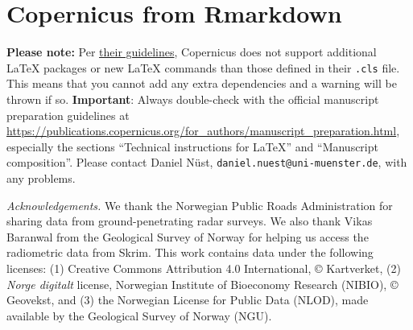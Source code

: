 \documentclass[soil, manuscript]{copernicus}
\begin{document}
\section{Copernicus from Rmarkdown}

\textbf{Please note:} Per \href{https://publications.copernicus.org/for_authors/manuscript_preparation.html}{their guidelines},
Copernicus does not support additional \LaTeX{} packages
or new \LaTeX{} commands than those defined in their \texttt{.cls} file.
This means that you cannot add any extra dependencies
and a warning will be thrown if so.
\textbf{Important}: Always double-check with the official manuscript preparation guidelines
at \url{https://publications.copernicus.org/for_authors/manuscript_preparation.html},
especially the sections ``Technical instructions for LaTeX'' and ``Manuscript composition''.
Please contact Daniel Nüst, \texttt{daniel.nuest@uni-muenster.de}, with any problems.
\noappendix




\begin{acknowledgements}
\emph{Acknowledgements.} We thank the Norwegian Public Roads Administration for sharing data from ground-penetrating radar surveys. We also thank Vikas Baranwal from the Geological Survey of Norway for helping us access the radiometric data from Skrim. This work contains data under the following licenses: (1) Creative Commons Attribution 4.0 International, © Kartverket, (2) \emph{Norge digitalt} license, Norwegian Institute of Bioeconomy Research (NIBIO), © Geovekst, and (3) the Norwegian License for Public Data (NLOD), made available by the Geological Survey of Norway (NGU).
\end{acknowledgements}
\end{document}
